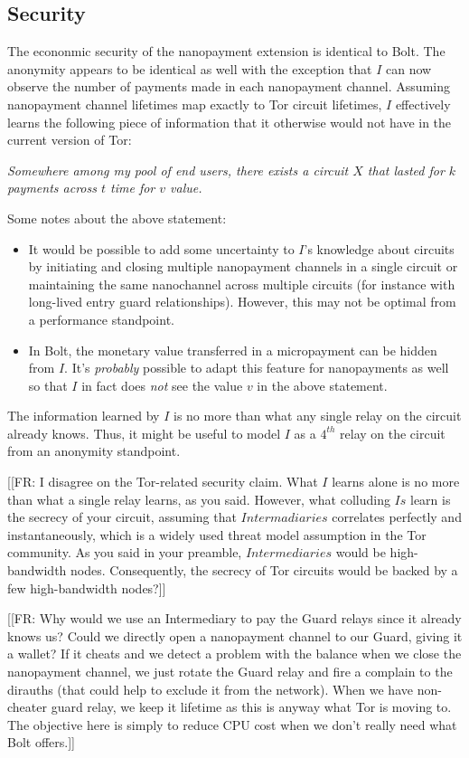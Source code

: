 \documentclass{article}
\newcommand{\flo}[1]{ {\color{red} [[FR: #1]]}}
\begin{document}
\subsection{Security}
The econonmic security of the nanopayment extension is identical to Bolt. The anonymity appears to be identical as well with the exception that $I$ can now observe the number of payments made in each nanopayment channel. Assuming nanopayment channel lifetimes map exactly to Tor circuit lifetimes, $I$ effectively learns the following piece of information that it otherwise would not have in the current version of Tor:

\emph{Somewhere among my pool of end users, there exists a circuit $X$ that lasted for $k$ payments across $t$ time for $v$ value.}

Some notes about the above statement:
\begin{itemize}
\item It would be possible to add some uncertainty to $I$'s knowledge about circuits by initiating and closing multiple nanopayment channels in a single circuit or maintaining the same nanochannel across multiple circuits (for instance with long-lived entry guard relationships). However, this may not be optimal from a performance standpoint.
\item In Bolt, the monetary value transferred in a micropayment can be hidden from $I$. It's \emph{probably} possible to adapt this feature for nanopayments as well so that $I$ in fact does \emph{not} see the value $v$ in the above statement.
\end{itemize}
The information learned by $I$ is no more than what any single relay on the circuit already knows. Thus, it might be useful to model $I$ as a $4^{th}$ relay on the circuit from an anonymity standpoint.

\flo{I disagree on the Tor-related security claim. What $I$ learns alone is no more than what a single relay learns, as you said. However, what colluding $Is$ learn is the secrecy of your circuit, assuming that $Intermadiaries$ correlates perfectly and instantaneously, which is a widely used threat model assumption in the Tor community. As you said in your preamble, $Intermediaries$ would be high-bandwidth nodes. Consequently, the secrecy of Tor circuits would be backed by a few high-bandwidth nodes?}

\flo{Why would we use an Intermediary to pay the Guard relays since it already knows us? Could we directly open a nanopayment channel to our Guard, giving it a wallet? If it cheats and we detect a problem with the balance when we close the nanopayment channel, we just rotate the Guard relay and fire a complain to the dirauths (that could help to exclude it from the network). When we have non-cheater guard relay, we keep it lifetime as this is anyway what Tor is moving to. The objective here is simply to reduce CPU cost when we don't really need what Bolt offers.}
\end{document}
